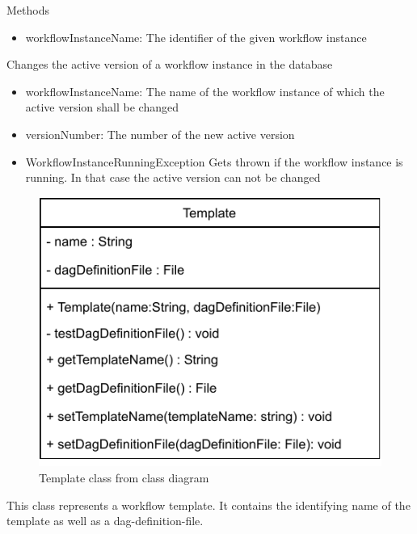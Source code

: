 \begin{methodenv}{Methods}
\begin{itemize}
	\item{workflowInstanceName:}
	The identifier of the given workflow instance
\end{itemize}

Changes the active version of a workflow instance in the database

\begin{itemize}
	\item{workflowInstanceName:}
	The name of the workflow instance of which the active version shall be changed
	\item{versionNumber:}
	The number of the new active version
\end{itemize}

\begin{itemize}
	\item{WorkflowInstanceRunningException}
	Gets thrown if the workflow instance is running. In that case the active version can not be changed
\end{itemize}
\end{methodenv}


\begin{figure}[h]
\centerline{\includegraphics[scale=1]{res/Klassen/Template.pdf}}
\caption{Template class from class diagram}
\end{figure}

This class represents a workflow template. It contains the identifying name of the template as well as a dag-definition-file.

